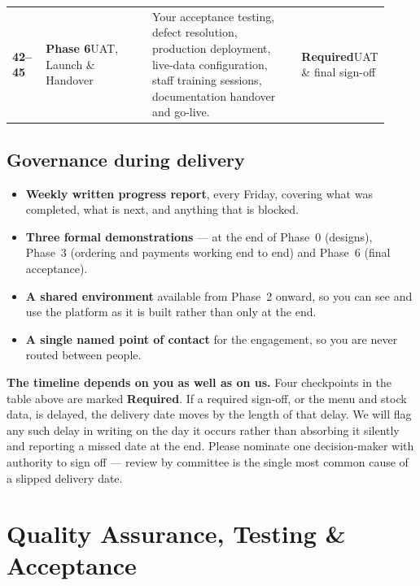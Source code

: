 \documentclass[11pt,a4paper]{article}
\begin{document}
\begin{longtable}{@{}L{0.09\linewidth}L{0.30\linewidth}L{0.42\linewidth}L{0.11\linewidth}@{}}
\textbf{42--45} & \textbf{Phase 6}\newline UAT, Launch \& Handover & Your acceptance testing,
defect resolution, production deployment, live-data configuration, staff training
sessions, documentation handover and go-live. & \textbf{Required}\newline UAT \& final sign-off \\

\end{longtable}

\subsection{Governance during delivery}

\begin{itemize}
\item \textbf{Weekly written progress report}, every Friday, covering what was completed,
what is next, and anything that is blocked.
\item \textbf{Three formal demonstrations} --- at the end of Phase~0 (designs), Phase~3
(ordering and payments working end to end) and Phase~6 (final acceptance).
\item \textbf{A shared environment} available from Phase~2 onward, so you can see and use
the platform as it is built rather than only at the end.
\item \textbf{A single named point of contact} for the engagement, so you are never
routed between people.
\end{itemize}

\begin{warnbox}
\textbf{The timeline depends on you as well as on us.} Four checkpoints in the table
above are marked \textbf{Required}. If a required sign-off, or the menu and stock data,
is delayed, the delivery date moves by the length of that delay. We will flag any such
delay in writing on the day it occurs rather than absorbing it silently and reporting a
missed date at the end. Please nominate one decision-maker with authority to sign off ---
review by committee is the single most common cause of a slipped delivery date.
\end{warnbox}

\clearpage

\section{Quality Assurance, Testing \& Acceptance}
\end{document}
